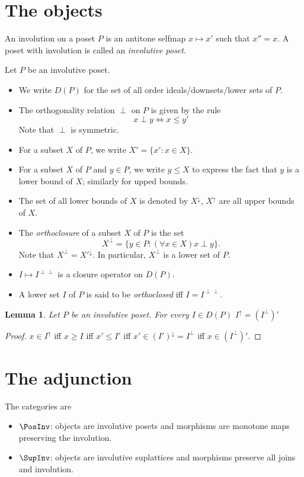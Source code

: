 \documentclass{article}
\newtheorem{lemma}[theorem]{Lemma}
\theoremstyle{definition}
\begin{document}
\section{The objects}

An involution on a poset $P$ is an antitone selfmap $x\mapsto x'$
such that $x''=x$. A poset with involution is called an {\em involutive poset}.

Let $P$ be an involutive poset.
\begin{itemize}
\item We write $D(P)$ for the set of all order ideals/downsets/lower sets of $P$.
\item The orthogonality relation $\perp$ on $P$ is given by the rule
	$$x\perp y\Leftrightarrow x\leq y'$$
Note that $\perp$ is symmetric.
\item For a subset $X$ of $P$, we write $X'=\{x':x\in X\}$.
\item For a subset $X$ of $P$ and $y\in P$, we write $y\leq X$ to express the fact that $y$ is a lower bound of $X$; similarly for upped bounds.
\item The set of all lower bounds of $X$ is denoted by $X^\downarrow$, $X^\uparrow$
	are all upper bounds of $X$.
\item The \emph{orthoclosure} of a subset $X$ of $P$ is the set
	$$X^\perp=\{y\in P:(\forall x\in X)x\perp y\}.$$
	Note that $X^\perp=X'^\downarrow$. In particular, $X^\perp$ is a lower set of $P$.
\item $I\mapsto I^{\perp\perp}$ is a closure operator on $D(P)$.
\item A lower set $I$ of $P$ is said to be \emph{orthoclosed} iff $I=I^{\perp\perp}$.
\end{itemize}

\begin{lemma}
Let $P$ be an involutive poset. For every $I\in D(P)$ 
$I^\uparrow=(I^\perp)'$
\end{lemma}
\begin{proof}
$x\in I^\uparrow$ iff $x\geq I$ iff $x'\leq I'$ iff $x'\in (I')^\downarrow=I^\perp$ iff $x\in (I^\perp)'$.
\end{proof}

\section{The adjunction}

The categories are
\begin{itemize}
	\item $\PosInv$: objects are involutive posets and morphisms are monotone maps preserving the involution.
	\item $\SupInv$: objects are involutive suplattices and morphisms preserve all joins and involution.
\end{itemize}
\end{document}
